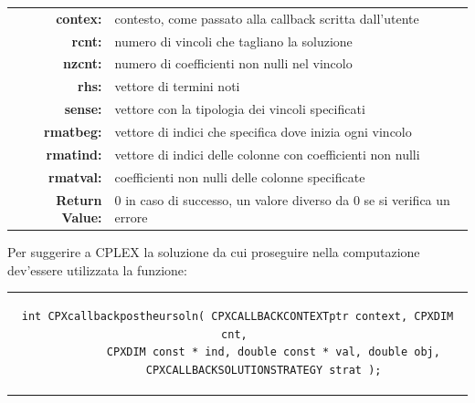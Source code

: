 \begin{table}[h]
\centering
\begin{tabular}{rl}
\textbf{contex:} & {contesto, come passato alla callback scritta dall'utente}\\
\textbf{rcnt:} & {numero di vincoli che tagliano la soluzione}\\
\textbf{nzcnt:} & {numero di coefficienti non nulli nel vincolo}\\
\textbf{rhs:} & {vettore di termini noti}\\
\textbf{sense:} & {vettore con la tipologia dei vincoli specificati}\\
\textbf{rmatbeg:} & {vettore di indici che specifica dove inizia ogni vincolo}\\
\textbf{rmatind:} & {vettore di indici delle colonne con coefficienti non nulli}\\
\textbf{rmatval:} & {coefficienti non nulli delle colonne specificate}\\
\textbf{Return Value:} & {0 in caso di successo, un valore diverso da 0 se si verifica un errore}\\
\end{tabular}
\end{table}
Per suggerire a CPLEX la soluzione da cui proseguire nella computazione dev'essere utilizzata la funzione:
\begin{center}
\begin{tabular}{c}
\begin{lstlisting}[linewidth=365pt, basicstyle=\footnotesize\sffamily,]
int CPXcallbackpostheursoln( CPXCALLBACKCONTEXTptr context, CPXDIM cnt, 
			CPXDIM const * ind, double const * val, double obj, 
			CPXCALLBACKSOLUTIONSTRATEGY strat );    
\end{lstlisting}
\end{tabular}
\end{center}
